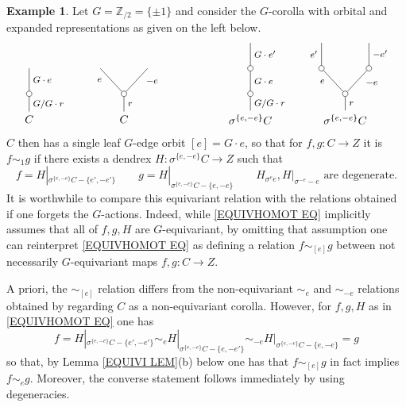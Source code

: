 \documentclass[a4paper,10pt]{article}%
\numberwithin{equation}{section}
\numberwithin{figure}{section}
\theoremstyle{definition} %
\newtheorem{example}[equation]{Example}%
\newcommand{\1}{\ensuremath{\mathbbm 1}}%
\begin{document}
\begin{example}\label{EQUIVSIM EX}
	Let $G = \mathbb{Z}_{/2} = \{\pm 1\}$
	and consider the $G$-corolla with orbital and expanded representations as given on the left below.
\[
\begin{tikzpicture}
[grow=up,auto,level distance=2.3em,every node/.style = {font=\footnotesize},dummy/.style={circle,draw,inner sep=0pt,minimum size=1.75mm}]
	\node at (0,0) [font=\normalsize]{$C$}
		child{node [dummy] {}
			child{
			edge from parent node [swap] {$G \cdot e$}
node [name=Kone,swap] {}}
		edge from parent node [swap] {$G/G \cdot r$}
		};
	\node at (3,0) [font=\normalsize]{$C$}
		child{node [dummy] {}
			child{
			edge from parent node [swap,near end] {$-e$} node [name=Kn] {}}
			child{
			edge from parent node [near end] {$e$}
node [name=Kone,swap] {}}
		edge from parent node [swap] {$r$}
		};
	\node at (7,0) [font=\normalsize]{$\sigma^{\{e,-e\}} C$}
		child{node [dummy] {}
			child{node [dummy] {}
				child{
				edge from parent node [swap] {$G \cdot e'$}
node [swap] {}}
			edge from parent node [swap] {$G \cdot e$}
node [swap] {}}
		edge from parent node [swap] {$G/G \cdot r$}
		};
	\node at (10,0) [font=\normalsize]{$\sigma^{\{e,-e\}} C$}
		child{node [dummy] {}
			child{node [dummy] {}
				child{
				edge from parent node [swap] {$-e'$} node {}}
			edge from parent node [swap,near end] {$-e$} node {}}
			child{node [dummy] {}
				child{
				edge from parent node {$e'$}
node [swap] {}}
			edge from parent node [near end] {$e$}
node [swap] {}}
		edge from parent node [swap] {$r$}
		};
\end{tikzpicture}
\]
$C$ then has a single leaf $G$-edge orbit $[e] = G \cdot e$, so that for
$f,g \colon C \to Z$ it is
$f \sim_1 g$
if there exists a dendrex
$H \colon \sigma^{\{e,-e\}}C \to Z$
such that 
\begin{equation}\label{EQUIVHOMOT EQ}
	f = H|_{\sigma^{\{e,-e\}}C - \{e',-e'\}}
\qquad
	g = H|_{\sigma^{\{e,-e\}}C - \{e,-e\}}
\qquad
	H_{\sigma^e e}, H|_{\sigma^{-e}-e} \text{ are degenerate}.
\end{equation}
It is worthwhile to compare this equivariant relation with the relations obtained if one forgets the $G$-actions. Indeed, while \eqref{EQUIVHOMOT EQ} implicitly assumes that all of $f,g,H$ are $G$-equivariant,
by omitting that assumption one can reinterpret 
\eqref{EQUIVHOMOT EQ}
as defining a relation
$f \sim_{[e]} g$ between not necessarily $G$-equivariant maps $f,g \colon C \to Z$.

A priori, the $\sim_{[e]}$ relation differs from the 
non-equivariant 
$\sim_{e}$ and $\sim_{-e}$
relations obtained by regarding $C$ as a non-equivariant corolla.
However, for $f,g,H$ as in \eqref{EQUIVHOMOT EQ} one has
\begin{equation}\label{EQUIVSIM EQ}
f = H|_{\sigma^{\{e,-e\}}C - \{e',-e'\}}
\sim_e H|_{\sigma^{\{e,-e\}}C - \{e,-e'\}}
\sim_{-e} H|_{\sigma^{\{e,-e\}}C - \{e,-e\}} =g
\end{equation}
so that, by Lemma \ref{EQUIVI LEM}(b) below one has that
$f \sim_{[e]} g$ in fact implies
$f \sim_{e} g$. Moreover, the converse statement follows immediately by using degeneracies.


\end{example}
\end{document}
